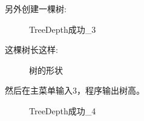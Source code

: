 \documentclass[supercite]{Experimental_Report}
\theoremstyle{definition}
\begin{document}
\noindent
另外创建一棵树:
\begin{figure}[htbp]
	\centering
	\centering
	\caption{TreeDepth成功\_3}
	\label{fig5-11}
\end{figure}

\clearpage
这棵树长这样:
\begin{figure}[htbp]
	\centering
	\centering
	\caption{树的形状}
	\label{fig5-12}
\end{figure}

\noindent
然后在主菜单输入3，程序输出树高。
\begin{figure}[htbp]
	\centering
	\centering
	\caption{TreeDepth成功\_4}
	\label{fig5-13}
\end{figure}
\end{document}
